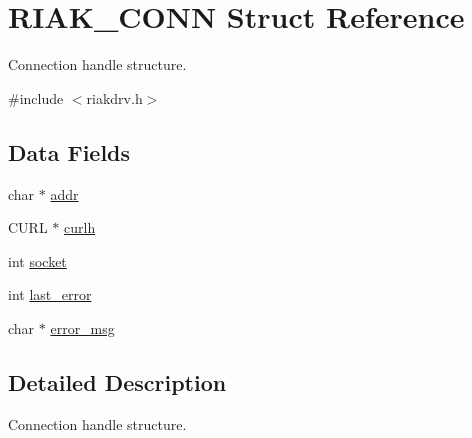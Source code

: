 \hypertarget{structRIAK__CONN}{
\section{RIAK\_\-CONN Struct Reference}
\label{structRIAK__CONN}
}


Connection handle structure.  




{\ttfamily \#include $<$riakdrv.h$>$}

\subsection*{Data Fields}
\begin{DoxyCompactItemize}
\item 
char $\ast$ \hyperlink{structRIAK__CONN_acdbc16cd5909783c8a43996bcfedde74}{addr}
\item 
CURL $\ast$ \hyperlink{structRIAK__CONN_a0c48f72b62d6eb51a7449c6fb3d93e3f}{curlh}
\item 
int \hyperlink{structRIAK__CONN_a2e3f4865323a6a35ef1b2bdccaaef497}{socket}
\item 
int \hyperlink{structRIAK__CONN_a45438c019b304f62a48fa4b7bd04c456}{last\_\-error}
\item 
char $\ast$ \hyperlink{structRIAK__CONN_a81357b1e5540c2347a8d10af43146647}{error\_\-msg}
\end{DoxyCompactItemize}


\subsection{Detailed Description}
Connection handle structure. 

